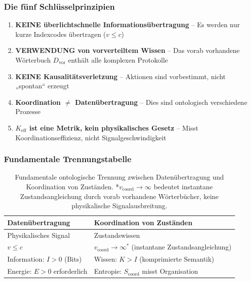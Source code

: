 \documentclass[11pt,a4paper]{article}
\begin{document}
	\subsubsection{Die fünf Schlüsselprinzipien}
	
	\begin{enumerate}[leftmargin=*]
		\item \textbf{KEINE überlichtschnelle Informationsübertragung} – Es werden nur kurze Indexcodes übertragen ($v \leq c$)
		\item \textbf{VERWENDUNG von vorverteiltem Wissen} – Das vorab vorhandene Wörterbuch $D_{\text{vor}}$ enthält alle komplexen Protokolle
		\item \textbf{KEINE Kausalitätsverletzung} – Aktionen sind vorbestimmt, nicht „spontan“ erzeugt
		\item \textbf{Koordination $\neq$ Datenübertragung} – Dies sind ontologisch verschiedene Prozesse
		\item \textbf{$K_{\mathrm{eff}}$ ist eine Metrik, kein physikalisches Gesetz} – Misst Koordinationseffizienz, nicht Signalgeschwindigkeit
	\end{enumerate}
	
	\subsubsection{Fundamentale Trennungstabelle}
	
	\begin{table}[H]
		\centering
		\begin{tabular}{|p{}|p{}|}
			\hline
			\textbf{Datenübertragung} & \textbf{Koordination von Zuständen} \\
			\hline
			Physikalisches Signal & Zustandswissen \\
			$v \leq c$ & $v_{\text{coord}} \to \infty^*$ (instantane Zustandsangleichung) \\
			Information: $I > 0$ (Bits) & Wissen: $K > I$ (komprimierte Semantik) \\
			Energie: $E > 0$ erforderlich & Entropie: $S_{\text{coord}}$ misst Organisation \\
			\hline
		\end{tabular}
		\caption{Fundamentale ontologische Trennung zwischen Datenübertragung und Koordination von Zuständen. *$v_{\text{coord}} \to \infty$ bedeutet instantane Zustandsangleichung durch vorab vorhandene Wörterbücher, keine physikalische Signalausbreitung.}
		\label{tab:coordination-vs-data}
	\end{table}
	
\end{document}
